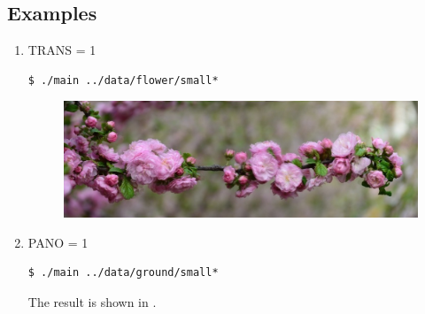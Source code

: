 \subsection{Examples}
\begin{enumerate}
\item TRANS = 1
  \begin{lstlisting}
$ ./main ../data/flower/small*
  \end{lstlisting}
\begin{figure}[H]
  \centering
  \includegraphics[scale=0.27]{res/small.png}
\end{figure}


  \item PANO = 1
    \begin{lstlisting}
$ ./main ../data/ground/small*
    \end{lstlisting}
    The result is shown in .
\end{enumerate}
